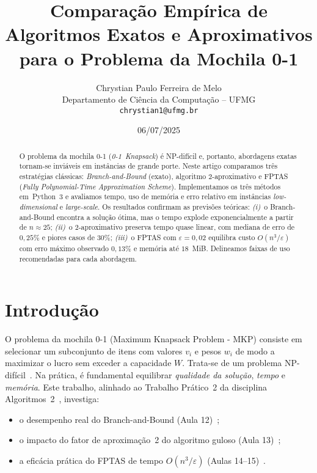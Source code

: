 \documentclass[10pt,a4paper]{article}
\title{Comparação Empírica de Algoritmos Exatos e Aproximativos
       para o Problema da Mochila 0-1}
\author{%
  Chrystian Paulo Ferreira de Melo\\[4pt]
  Departamento de Ciência da Computação – UFMG\\
  \texttt{chrystian1@ufmg.br}}
\date{06/07/2025}
\begin{document}
\maketitle

\begin{abstract}
O problema da mochila 0-1 (\textit{0-1~Knapsack}) é NP-difícil e,
portanto, abordagens exatas tornam-se inviáveis em instâncias de
grande porte.  Neste artigo comparamos três estratégias clássicas:
\emph{Branch-and-Bound} (exato), algoritmo
\mbox{2-aproximativo} e FPTAS
(\textit{Fully Polynomial-Time Approximation Scheme}).  Implementamos
os três métodos em~Python~3 e avaliamos tempo, uso de memória e erro
relativo em instâncias \textit{low-dimensional} e
\textit{large-scale}.  Os resultados confirmam as previsões
teóricas: \emph{(i)}~o Branch-and-Bound encontra a solução ótima,
mas o tempo explode exponencialmente a partir de
$n\!\approx\!25$; \emph{(ii)}~o 2-aproximativo preserva
tempo quase linear, com mediana de erro de
$0{,}25\%$ e piores casos de $30\%$; \emph{(iii)}~o
FPTAS com $\varepsilon=0{,}02$ equilibra custo
$O(n^{3}/\varepsilon)$ com erro máximo observado
$0{,}13\%$ e memória até $18$~MiB.  Delineamos faixas de uso
recomendadas para cada abordagem.
\end{abstract}

\section{Introdução}
O problema da mochila 0-1 (Maximum Knapsack Problem - MKP) consiste em selecionar um subconjunto
de itens com valores $v_i$ e pesos $w_i$ de modo a maximizar o lucro
sem exceder a capacidade $W$.  Trata-se de um problema
NP-difícil~\cite{aula07,aula08}.  Na prática, é fundamental
equilibrar \emph{qualidade da solução}, \emph{tempo} e
\emph{memória}.  Este trabalho, alinhado ao
Trabalho Prático~2 da disciplina Algoritmos~2~\cite{roteiro},
investiga:
\begin{itemize}
  \item o desempenho real do Branch-and-Bound (Aula 12)~\cite{aula12};
  \item o impacto do fator de aproximação~2 do algoritmo guloso
        (Aula 13)~\cite{aula13};
  \item a eficácia prática do FPTAS de tempo
        $O(n^{3}/\varepsilon)$ (Aulas 14–15)~\cite{aula14,aula15}.
\end{itemize}
\end{document}
